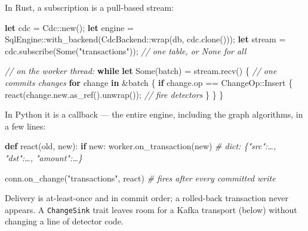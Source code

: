 \documentclass[
  11pt,
  openany]{book}
\newenvironment{Shaded}{}{}
\newcommand{\CommentTok}[1]{\textcolor[rgb]{0.38,0.63,0.69}{\textit{#1}}}
\newcommand{\ConstantTok}[1]{\textcolor[rgb]{0.53,0.00,0.00}{#1}}
\newcommand{\ControlFlowTok}[1]{\textcolor[rgb]{0.00,0.44,0.13}{\textbf{#1}}}
\newcommand{\KeywordTok}[1]{\textcolor[rgb]{0.00,0.44,0.13}{\textbf{#1}}}
\newcommand{\NormalTok}[1]{#1}
\newcommand{\OperatorTok}[1]{\textcolor[rgb]{0.40,0.40,0.40}{#1}}
\newcommand{\PreprocessorTok}[1]{\textcolor[rgb]{0.74,0.48,0.00}{#1}}
\newcommand{\StringTok}[1]{\textcolor[rgb]{0.25,0.44,0.63}{#1}}
\begin{document}
In Rust, a subscription is a pull-based stream:

\begin{Shaded}
\begin{Highlighting}[]
\KeywordTok{let}\NormalTok{ cdc }\OperatorTok{=} \PreprocessorTok{Cdc::}\NormalTok{new()}\OperatorTok{;}
\KeywordTok{let}\NormalTok{ engine }\OperatorTok{=} \PreprocessorTok{SqlEngine::}\NormalTok{with\_backend(}\PreprocessorTok{CdcBackend::}\NormalTok{wrap(db}\OperatorTok{,}\NormalTok{ cdc}\OperatorTok{.}\NormalTok{clone()))}\OperatorTok{;}
\KeywordTok{let}\NormalTok{ stream }\OperatorTok{=}\NormalTok{ cdc}\OperatorTok{.}\NormalTok{subscribe(}\ConstantTok{Some}\NormalTok{(}\StringTok{"transactions"}\NormalTok{))}\OperatorTok{;}   \CommentTok{// one table, or None for all}

\CommentTok{// on the worker thread:}
\ControlFlowTok{while} \KeywordTok{let} \ConstantTok{Some}\NormalTok{(batch) }\OperatorTok{=}\NormalTok{ stream}\OperatorTok{.}\NormalTok{recv() }\OperatorTok{\{}              \CommentTok{// one commit\textquotesingle{}s changes}
    \ControlFlowTok{for}\NormalTok{ change }\KeywordTok{in} \OperatorTok{\&}\NormalTok{batch }\OperatorTok{\{}
        \ControlFlowTok{if}\NormalTok{ change}\OperatorTok{.}\NormalTok{op }\OperatorTok{==} \PreprocessorTok{ChangeOp::}\NormalTok{Insert }\OperatorTok{\{}
\NormalTok{            react(change}\OperatorTok{.}\NormalTok{new}\OperatorTok{.}\NormalTok{as\_ref()}\OperatorTok{.}\NormalTok{unwrap())}\OperatorTok{;}     \CommentTok{// fire detectors}
        \OperatorTok{\}}
    \OperatorTok{\}}
\OperatorTok{\}}
\end{Highlighting}
\end{Shaded}

In Python it is a callback --- the entire engine, including the graph
algorithms, in a few lines:

\begin{Shaded}
\begin{Highlighting}[]
\KeywordTok{def}\NormalTok{ react(old, new):}
    \ControlFlowTok{if}\NormalTok{ new:}
\NormalTok{        worker.on\_transaction(new)          }\CommentTok{\# dict: \{"src":…, "dst":…, "amount":…\}}

\NormalTok{conn.on\_change(}\StringTok{"transactions"}\NormalTok{, react)       }\CommentTok{\# fires after every committed write}
\end{Highlighting}
\end{Shaded}

Delivery is at-least-once and in commit order; a rolled-back transaction
never appears. A \texttt{ChangeSink} trait leaves room for a Kafka
transport (below) without changing a line of detector code.
\end{document}
